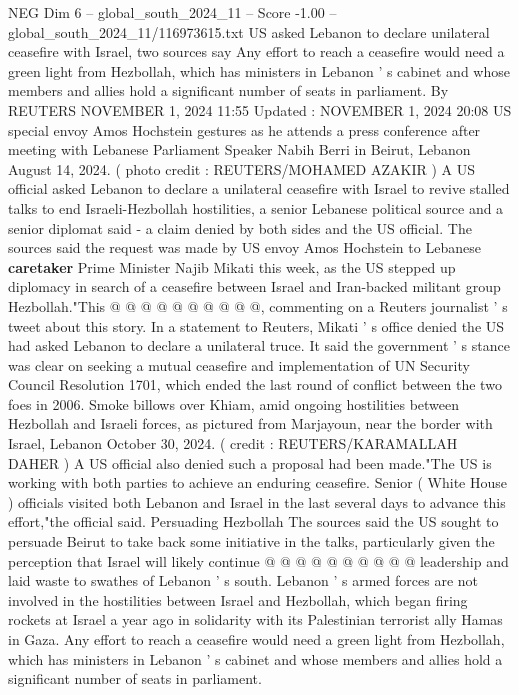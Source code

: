 \begin{textsample}{NEG Dim 6 – global\_south\_2024\_11 – Score -1.00 – global\_south\_2024\_11/116973615.txt}  \label{ex:f6_neg_065}
US asked Lebanon to declare unilateral ceasefire with Israel, two sources say Any effort to reach a ceasefire would need a green light from Hezbollah, which has ministers in Lebanon ' s cabinet and whose members and allies hold a significant number of seats in parliament.
By REUTERS NOVEMBER 1, 2024 11:55 Updated : NOVEMBER 1, 2024 20:08 US special envoy Amos Hochstein gestures as he attends a press conference after meeting with Lebanese Parliament Speaker Nabih Berri in Beirut, Lebanon August 14, 2024. ( photo credit : REUTERS/MOHAMED AZAKIR ) A US official asked Lebanon to declare a unilateral ceasefire with Israel to revive stalled talks to end Israeli-Hezbollah hostilities, a senior Lebanese political source and a senior diplomat said - a claim denied by both sides and the US official.
The sources said the request was made by US envoy Amos Hochstein to Lebanese \textbf{caretaker} Prime Minister Najib Mikati this week, as the US stepped up diplomacy in search of a ceasefire between Israel and Iran-backed militant group Hezbollah."This @ @ @ @ @ @ @ @ @ @, commenting on a Reuters journalist ' s tweet about this story.
In a statement to Reuters, Mikati ' s office denied the US had asked Lebanon to declare a unilateral truce.
It said the government ' s stance was clear on seeking a mutual ceasefire and implementation of UN Security Council Resolution 1701, which ended the last round of conflict between the two foes in 2006.
Smoke billows over Khiam, amid ongoing hostilities between Hezbollah and Israeli forces, as pictured from Marjayoun, near the border with Israel, Lebanon October 30, 2024. ( credit : REUTERS/KARAMALLAH DAHER ) A US official also denied such a proposal had been made."The US is working with both parties to achieve an enduring ceasefire.
Senior ( White House ) officials visited both Lebanon and Israel in the last several days to advance this effort,"the official said.
Persuading Hezbollah The sources said the US sought to persuade Beirut to take back some initiative in the talks, particularly given the perception that Israel will likely continue @ @ @ @ @ @ @ @ @ @ leadership and laid waste to swathes of Lebanon ' s south.
Lebanon ' s armed forces are not involved in the hostilities between Israel and Hezbollah, which began firing rockets at Israel a year ago in solidarity with its Palestinian terrorist ally Hamas in Gaza.
Any effort to reach a ceasefire would need a green light from Hezbollah, which has ministers in Lebanon ' s cabinet and whose members and allies hold a significant number of seats in parliament.

\end{textsample}
